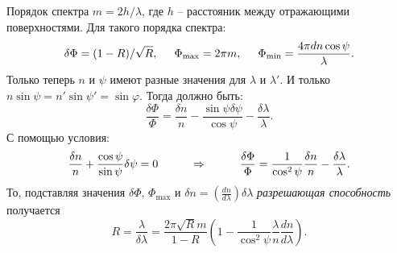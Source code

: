 Порядок спектра $m = 2 h/\lambda$, где $h$ -- расстояник между отражающими поверхностями. Для такого порядка спектра:
\begin{equation*}
    \delta\Phi = (1-R)/\sqrt{R},
    \hspace{0.5 cm}
    \Phi_{\text{max}} = 2 \pi m,
    \hspace{0.5 cm}
    \Phi_{\text{min}} = \frac{4 \pi d n \cos \psi}{\lambda}.
\end{equation*}
Только теперь $n$ и $\psi$ имеют разные значения для $\lambda$ и $\lambda'$. И только $n\sin \psi = n' \sin \psi' = \sin \varphi$. Тогда должно быть:
\begin{equation*}
    \frac{\delta \Phi}{\Phi} = \frac{\delta n}{n} - \frac{\sin \psi \delta \psi}{\cos \psi}- \frac{\delta \lambda}{\lambda}.
\end{equation*}
С помощью условия:
\begin{equation*}
    \frac{\delta n}{n} + \frac{\cos \psi}{\sin \psi} \delta \psi = 0
    \hspace{1 cm}
    \Rightarrow
    \hspace{1 cm}
    \frac{\delta \Phi}{\Phi} = \frac{1}{\cos^2 \psi}\frac{\delta n}{n} - \frac{\delta \lambda}{\lambda}.
\end{equation*}
То, подставляя значения $\delta \Phi$, $\Phi_{\text{max}}$ и $\delta n = \left(\frac{d n}{d \lambda}\right) \delta \lambda$ \textit{разрешающая способность} получается
\begin{equation*}
    R = \frac{\lambda}{\delta\lambda} = \frac{2 \pi \sqrt{R} m}{1 - R}\left(1 - \frac{1}{\cos^2 \psi} \frac{\lambda}{n} \frac{d n}{d \lambda}\right).
\end{equation*}


